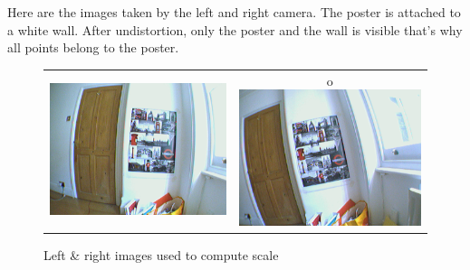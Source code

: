 \documentclass[11pt]{report}
\begin{document}
Here are the images taken by the left and right camera. The poster is attached to a white wall. After undistortion, only the poster and the wall is visible that's why all points belong to the poster.
\begin{figure}[H]
\centering
\begin{tabular}{cc}
\includegraphics[scale=0.25]{images/left_scale.png} &
o\includegraphics[scale=0.25]{images/right_scale.png} \\
\end{tabular}
\caption{Left \& right images used to compute scale}
\end{figure}
\end{document}
